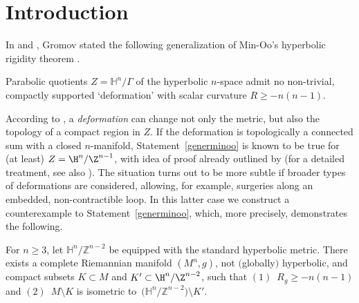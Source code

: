 \section{Introduction}

In \cite[Section 3]{Gr2019} and \cite[p.~240]{Gr2021}, Gromov stated the following generalization
of Min-Oo's hyperbolic rigidity theorem \cite{MinOo89}.

\begin{State}\label{generminoo}
Parabolic quotients $Z=\mathbb{H}^n/\Gamma$ of the hyperbolic $n$-space admit no non-trivial, compactly supported `deformation' with scalar curvature $R\geq -n(n-1)$.
\end{State}
According to \cite{Gr2019}, a \emph{deformation} can change not only the metric, but also the topology of a compact region in $Z$.
If the deformation is topologically a connected sum with
a closed $n$-manifold,
Statement~\ref{generminoo} is known to be true for (at least) $Z = \H^n/\Z^{n-1}$,
with idea of proof already outlined by \cite[Section $5\frac{5}{6}$]{Gr93} (for a detailed treatment, see
also  \cite[Theorem 1.1]{ACG08}).
The situation
turns out to be more subtle
if broader types of deformations are considered, allowing, for example, surgeries along
an embedded, non-contractible loop.
In this latter case we construct a counterexample to Statement~\ref{generminoo}, which, more precisely,
demonstrates the following.

\begin{Theorem}\label{counterexample}
For $n\ge 3$, let $\mathbb{H}^n/\mathbb{Z}^{n-2}$ be equipped with the standard hyperbolic metric.
There exists a complete Riemannian manifold $(M^n,g)$, not $($globally$)$ hyperbolic, and
compact subsets $K\subset M$ and $K'\subset\H^n/\Z^{n-2}$, such that $(1)$~$R_g\ge -n(n-1)$ and $(2)$~$M\setminus K$ is isometric to~$\big(\mathbb{H}^n/\mathbb{Z}^{n-2}\big)\setminus K'$.	
\end{Theorem}
